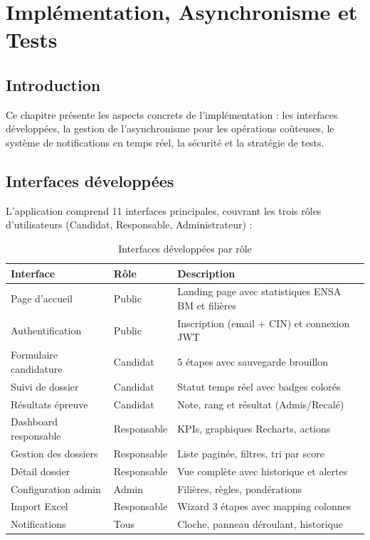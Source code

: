 \chapter{Implémentation, Asynchronisme et Tests}
\label{chapitre-4-implementation-asynchronisme-et-tests}

\section{Introduction}
Ce chapitre présente les aspects concrets de l'implémentation : les interfaces développées, la gestion de l'asynchronisme pour les opérations coûteuses, le système de notifications en temps réel, la sécurité et la stratégie de tests.

\section{Interfaces développées}
L'application comprend 11 interfaces principales, couvrant les trois rôles d'utilisateurs (Candidat, Responsable, Administrateur) :

\begin{table}[htbp]
\centering
\caption{Interfaces développées par rôle}
\label{tab:interfaces}
\begin{tabular}{p{4.5cm} p{2.5cm} p{7cm}}
\toprule
\textbf{Interface} & \textbf{Rôle} & \textbf{Description} \\
\midrule
Page d'accueil & Public & Landing page avec statistiques ENSA BM et filières \\
Authentification & Public & Inscription (email + CIN) et connexion JWT \\
Formulaire candidature & Candidat & 5 étapes avec sauvegarde brouillon \\
Suivi de dossier & Candidat & Statut temps réel avec badges colorés \\
Résultats épreuve & Candidat & Note, rang et résultat (Admis/Recalé) \\
Dashboard responsable & Responsable & KPIs, graphiques Recharts, actions \\
Gestion des dossiers & Responsable & Liste paginée, filtres, tri par score \\
Détail dossier & Responsable & Vue complète avec historique et alertes \\
Configuration admin & Admin & Filières, règles, pondérations \\
Import Excel & Responsable & Wizard 3 étapes avec mapping colonnes \\
Notifications & Tous & Cloche, panneau déroulant, historique \\
\bottomrule
\end{tabular}
\end{table}

